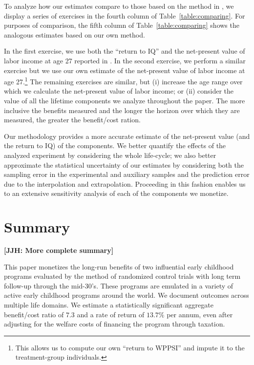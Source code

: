 To analyze how our estimates compare to those based on the method in \citet{Kline_Walters_2016_QJE}, we display a series of exercises in the fourth column of Table~\ref{table:comparing}. For purposes of comparison, the fifth column of Table~\ref{table:comparing} shows the analogous estimates based on our own method.

In the first exercise, we use both the ``return to IQ'' and the net-present value of labor income at age 27 reported in  \citet{Chetty_Friedman_etal_2011_QJoE}. In the second exercise, we perform a similar exercise but we use our own estimate of the net-present value of labor income at age 27.\footnote{This allows us to compute our own ``return to WPPSI'' and impute it to the treatment-group individuals.} The remaining exercises are similar, but (i) increase the age range over which we calculate the net-present value of labor income; or (ii) consider the value of all the lifetime components we analyze throughout the paper. The more inclusive the benefits measured and the longer the horizon over which they are measured, the greater the benefit/cost ration.

Our methodology provides a more accurate estimate of the net-present value (and the return to IQ) of the components. We better quantify the effects of the analyzed experiment by considering the whole life-cycle; we also better approximate the statistical uncertainty of our estimates by considering both the sampling error in the experimental and auxiliary samples and the prediction error due to the interpolation and extrapolation. Proceeding in this fashion enables us to an extensive sensitivity analysis of each of the components we monetize.

\section{Summary} \label{section:conclusion} \textbf{[JJH: More complete summary]}

This paper monetizes the long-run benefits of two influential early childhood programs evaluated by the method of randomized control trials with long term follow-up through the mid-30's. These programs are emulated in a variety of active early childhood programs around the world. We document outcomes across multiple life domains. We estimate a statistically significant aggregate benefit/cost ratio of $7.3$ and a rate of return of $13.7\%$ per annum, even after adjusting for the welfare costs of financing the program through taxation.

